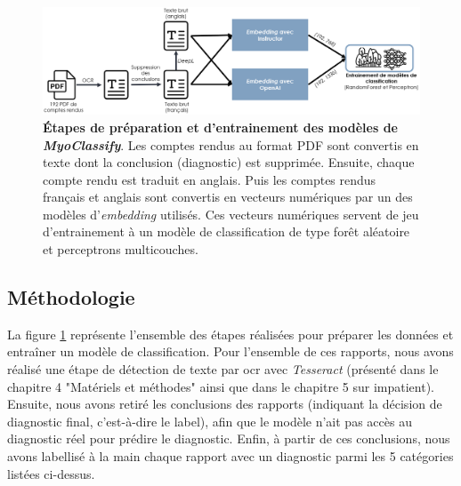 \begin{figure}[htbp]
 \centering
 \includegraphics[width=1\textwidth]{figures/myoclassify_flow.png}
 \caption[Entrainement modèle \textit{MyoClassify}]{\textbf{Étapes de préparation et d'entrainement des modèles de \textit{MyoClassify}}. Les comptes rendus au format PDF sont convertis en texte dont la conclusion (diagnostic) est supprimée. Ensuite, chaque compte rendu est traduit en anglais. Puis les comptes rendus français et anglais sont convertis en vecteurs numériques par un des modèles d'\textit{embedding} utilisés. Ces vecteurs numériques servent de jeu d'entrainement à un modèle de classification de type forêt aléatoire et perceptrons multicouches.}
 \label{fig:myoclassify_flow}
\end{figure}

\subsection{Méthodologie}
La figure \ref{fig:myoclassify_flow} représente l'ensemble des étapes réalisées pour préparer les données et entraîner un modèle de classification. Pour l'ensemble de ces rapports, nous avons réalisé une étape de détection de texte par \gls{ocr} avec \textit{Tesseract} (présenté dans le chapitre 4 "Matériels et méthodes" ainsi que dans le chapitre 5 sur \gls{impatient}). Ensuite, nous avons retiré les conclusions des rapports (indiquant la décision de diagnostic final, c'est-à-dire le label), afin que le modèle n'ait pas accès au diagnostic réel pour prédire le diagnostic. Enfin, à partir de ces conclusions, nous avons labellisé à la main chaque rapport avec un diagnostic parmi les 5 catégories listées ci-dessus.

